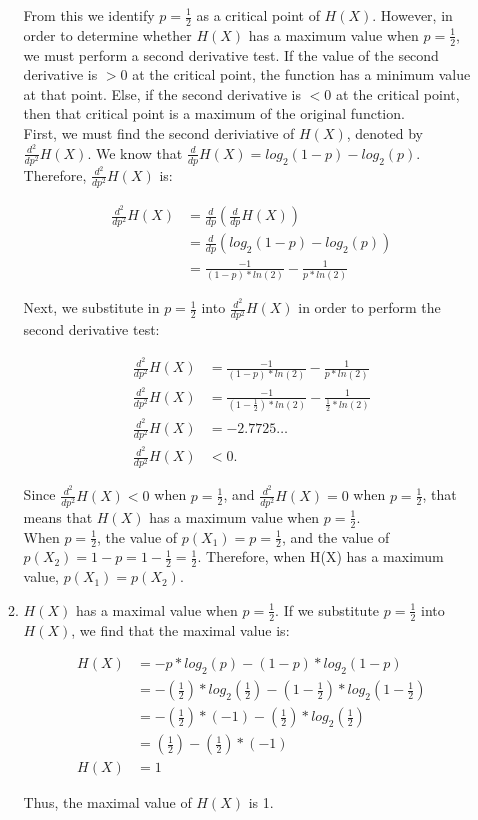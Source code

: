 \documentclass[11pt]{article}
\theoremstyle{definition}
\begin{document}
\begin{enumerate}
\begin{enumerate}
From this we identify $p = \frac{1}{2}$ as a critical point of $H(X)$. However, in order to determine whether $H(X)$ has a maximum value when $p = \frac{1}{2}$, we must perform a second derivative
test. If the value of the second derivative is $> 0$ at the critical point, the function has a minimum value at that point. Else, if the second derivative is $< 0$ at the critical point, then that critical
point is a maximum of the original function.\\

First, we must find the second deriviative of $H(X)$, denoted by $\frac{d^2}{dp^2}H(X)$. We know that $\frac{d}{dp}H(X) = log_2(1 - p) - log_2(p)$. Therefore, $\frac{d^2}{dp^2}H(X)$ is:

\begin{align*}
\frac{d^2}{dp^2}H(X) &= \frac{d}{dp}(\frac{d}{dp}H(X))\\
&= \frac{d}{dp}(log_2(1 - p) - log_2(p))\\
&= \frac{-1}{(1 - p) * ln(2)} - \frac{1}{p * ln(2)}
\end{align*}

Next, we substitute in $p = \frac{1}{2}$ into $\frac{d^2}{dp^2}H(X)$ in order to perform the second derivative test:

\begin{align*}
\frac{d^2}{dp^2}H(X) &= \frac{-1}{(1 - p) * ln(2)} - \frac{1}{p * ln(2)}\\
\frac{d^2}{dp^2}H(X) &= \frac{-1}{(1 - \frac{1}{2}) * ln(2)} - \frac{1}{\frac{1}{2} * ln(2)}\\
\frac{d^2}{dp^2}H(X) &= -2.7725\ldots \\
\frac{d^2}{dp^2}H(X) &< 0.
\end{align*}

Since $\frac{d^2}{dp^2}H(X) < 0$ when $p = \frac{1}{2}$, and $\frac{d^2}{dp^2}H(X) = 0$ when $p = \frac{1}{2}$, that means that $H(X)$ has a maximum value when $p = \frac{1}{2}$.\\

When $p = \frac{1}{2}$, the value of $p(X_1) = p = \frac{1}{2}$, and the value of $p(X_2) = 1 - p = 1 - \frac{1}{2} = \frac{1}{2}$. Therefore, when H(X) has a maximum value, $p(X_1) = p(X_2)$.

\item $H(X)$ has a maximal value when $p = \frac{1}{2}$. If we substitute $p = \frac{1}{2}$ into $H(X)$, we find that the maximal value is:

\begin{align*}
H(X) &= -p * log_2(p) - (1 - p) * log_2(1 - p)\\
&= -(\frac{1}{2}) * log_2(\frac{1}{2}) - (1 - \frac{1}{2}) * log_2(1 - \frac{1}{2})\\
&= -(\frac{1}{2}) * (-1) - (\frac{1}{2}) * log_2(\frac{1}{2})\\
&= (\frac{1}{2}) - (\frac{1}{2}) * (-1)\\
H(X) &= 1
\end{align*}

Thus, the maximal value of $H(X)$ is 1.

\end{enumerate}

\end{enumerate}
\end{document}
